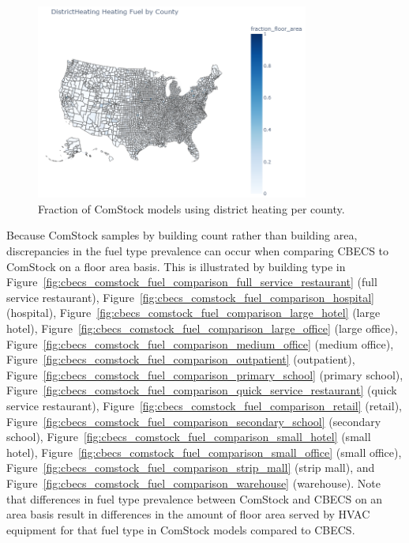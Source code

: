 \begin{figure}
  \centering
  \includegraphics[width=0.8\textwidth]{figures/map_districtheating.png}
  \caption[Fraction of ComStock models using district heating/water heating per county]{Fraction of ComStock models using district heating per county.}
  \label{fig:map_district}
\end{figure}

Because ComStock samples by building count rather than building area, discrepancies in the fuel type prevalence can occur when comparing CBECS to ComStock on a floor area basis. This is illustrated by building type in Figure~\ref{fig:cbecs_comstock_fuel_comparison_full_service_restaurant} (full service restaurant), Figure~\ref{fig:cbecs_comstock_fuel_comparison_hospital} (hospital), Figure~\ref{fig:cbecs_comstock_fuel_comparison_large_hotel} (large hotel), Figure~\ref{fig:cbecs_comstock_fuel_comparison_large_office} (large office), Figure~\ref{fig:cbecs_comstock_fuel_comparison_medium_office} (medium office), Figure~\ref{fig:cbecs_comstock_fuel_comparison_outpatient} (outpatient), Figure~\ref{fig:cbecs_comstock_fuel_comparison_primary_school} (primary school), Figure~\ref{fig:cbecs_comstock_fuel_comparison_quick_service_restaurant} (quick service restaurant), Figure~\ref{fig:cbecs_comstock_fuel_comparison_retail} (retail), Figure~\ref{fig:cbecs_comstock_fuel_comparison_secondary_school} (secondary school), Figure~\ref{fig:cbecs_comstock_fuel_comparison_small_hotel} (small hotel), Figure~\ref{fig:cbecs_comstock_fuel_comparison_small_office} (small office), Figure~\ref{fig:cbecs_comstock_fuel_comparison_strip_mall} (strip mall), and Figure~\ref{fig:cbecs_comstock_fuel_comparison_warehouse} (warehouse). Note that differences in fuel type prevalence between ComStock and CBECS on an area basis result in differences in the amount of floor area served by HVAC equipment for that fuel type in ComStock models compared to CBECS.

